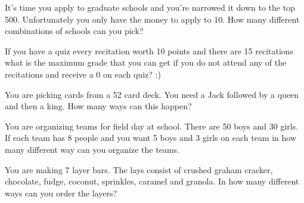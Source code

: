 \begin{problem}
\begin{subproblem}
      \vfill

      \clearpage

    \item It's time you apply to graduate schools and you're narrowed
      it down to the top 500. Unfortunately you only have the money to
      apply to 10. How many different combinations of schools can you
      pick?

      \vfill

    \item If you have a quiz every recitation worth 10 points and
      there are 15 recitations what is the maximum grade that you can
      get if you do not attend any of the recitations and receive a 0
      on each quiz? :)

      \vfill

    \item You are picking cards from a 52 card deck. You need a Jack
      followed by a queen and then a king. How many ways can this
      happen?

      \vfill

      \clearpage

    \item You are organizing teams for field day at school. There are
      50 boys and 30 girls. If each team has 8 people and you want 5
      boys and 3 girls on each team in how many different way can you
      organize the teams.

      \vfill

    \item You are making 7 layer bars. The lays consist of crushed
      graham cracker, chocolate, fudge, coconut, sprinkles, caramel
      and granola. In how many different ways can you order the
      layers?

      \vfill

  \end{subproblem}

\end{problem}



